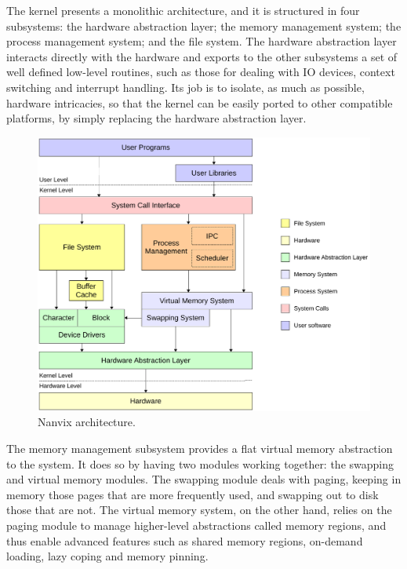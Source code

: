 \documentclass[10pt,a4paper]{article}
\begin{document}
The kernel presents a monolithic architecture, and it is structured in four subsystems: the hardware abstraction layer; the memory management system; the process management system; and the file system. The hardware abstraction layer interacts directly with the hardware and exports to the other subsystems a set of well defined low-level routines, such as those for dealing with IO devices, context switching and interrupt handling. Its job is to isolate, as much as possible, hardware intricacies, so that the kernel can be easily ported to other compatible platforms, by simply replacing the hardware abstraction layer.

\begin{figure}[t]
	\centering
	\includegraphics[scale=0.61]{img/nanvix-architecture}
	\caption{Nanvix architecture.}
	\label{figure: nanvix architecture}
\end{figure}

The memory management subsystem provides a flat virtual memory abstraction to the system. It does so by having two modules working together: the swapping and virtual memory modules. The swapping module deals with paging, keeping in memory those pages that are more frequently used, and swapping out to disk those that are not. The virtual memory system, on the other hand, relies on the paging module to manage higher-level abstractions called memory regions, and thus enable advanced features such as shared memory regions, on-demand loading, lazy coping and memory pinning.
\end{document}
